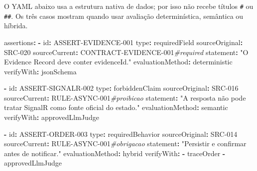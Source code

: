 \documentclass[
  10pt,
  a4paper,
  oneside]{book}
\newenvironment{Shaded}{}{}
\newcommand{\AttributeTok}[1]{\textcolor[rgb]{0.49,0.56,0.16}{#1}}
\newcommand{\CommentTok}[1]{\textcolor[rgb]{0.38,0.63,0.69}{\textit{#1}}}
\newcommand{\FunctionTok}[1]{\textcolor[rgb]{0.02,0.16,0.49}{#1}}
\newcommand{\KeywordTok}[1]{\textcolor[rgb]{0.00,0.44,0.13}{\textbf{#1}}}
\newcommand{\StringTok}[1]{\textcolor[rgb]{0.25,0.44,0.63}{#1}}
\begin{document}
O YAML abaixo usa a estrutura nativa de dados; por isso não recebe
títulos \texttt{\#} ou \texttt{\#\#}. Os três casos mostram quando usar
avaliação determinística, semântica ou híbrida.

\begin{Shaded}
\begin{Highlighting}[]
\FunctionTok{assertions}\KeywordTok{:}
\AttributeTok{  }\KeywordTok{{-}}\AttributeTok{ }\FunctionTok{id}\KeywordTok{:}\AttributeTok{ ASSERT{-}EVIDENCE{-}001}
\AttributeTok{    }\FunctionTok{type}\KeywordTok{:}\AttributeTok{ requiredField}
\AttributeTok{    }\FunctionTok{sourceOriginal}\KeywordTok{:}\AttributeTok{ SRC{-}020}
\AttributeTok{    }\FunctionTok{sourceCurrent}\KeywordTok{:}\AttributeTok{ CONTRACT{-}EVIDENCE{-}001}\CommentTok{\#required}
\AttributeTok{    }\FunctionTok{statement}\KeywordTok{:}\AttributeTok{ }\StringTok{"O Evidence Record deve conter evidenceId."}
\AttributeTok{    }\FunctionTok{evaluationMethod}\KeywordTok{:}\AttributeTok{ deterministic}
\AttributeTok{    }\FunctionTok{verifyWith}\KeywordTok{:}\AttributeTok{ jsonSchema}

\AttributeTok{  }\KeywordTok{{-}}\AttributeTok{ }\FunctionTok{id}\KeywordTok{:}\AttributeTok{ ASSERT{-}SIGNALR{-}002}
\AttributeTok{    }\FunctionTok{type}\KeywordTok{:}\AttributeTok{ forbiddenClaim}
\AttributeTok{    }\FunctionTok{sourceOriginal}\KeywordTok{:}\AttributeTok{ SRC{-}016}
\AttributeTok{    }\FunctionTok{sourceCurrent}\KeywordTok{:}\AttributeTok{ RULE{-}ASYNC{-}001}\CommentTok{\#proibicao}
\AttributeTok{    }\FunctionTok{statement}\KeywordTok{:}\AttributeTok{ }\StringTok{"A resposta não pode tratar SignalR como fonte oficial do estado."}
\AttributeTok{    }\FunctionTok{evaluationMethod}\KeywordTok{:}\AttributeTok{ semantic}
\AttributeTok{    }\FunctionTok{verifyWith}\KeywordTok{:}\AttributeTok{ approvedLlmJudge}

\AttributeTok{  }\KeywordTok{{-}}\AttributeTok{ }\FunctionTok{id}\KeywordTok{:}\AttributeTok{ ASSERT{-}ORDER{-}003}
\AttributeTok{    }\FunctionTok{type}\KeywordTok{:}\AttributeTok{ requiredBehavior}
\AttributeTok{    }\FunctionTok{sourceOriginal}\KeywordTok{:}\AttributeTok{ SRC{-}014}
\AttributeTok{    }\FunctionTok{sourceCurrent}\KeywordTok{:}\AttributeTok{ RULE{-}ASYNC{-}001}\CommentTok{\#obrigacao}
\AttributeTok{    }\FunctionTok{statement}\KeywordTok{:}\AttributeTok{ }\StringTok{"Persistir e confirmar antes de notificar."}
\AttributeTok{    }\FunctionTok{evaluationMethod}\KeywordTok{:}\AttributeTok{ hybrid}
\AttributeTok{    }\FunctionTok{verifyWith}\KeywordTok{:}
\AttributeTok{      }\KeywordTok{{-}}\AttributeTok{ traceOrder}
\AttributeTok{      }\KeywordTok{{-}}\AttributeTok{ approvedLlmJudge}
\end{Highlighting}
\end{Shaded}
\end{document}
